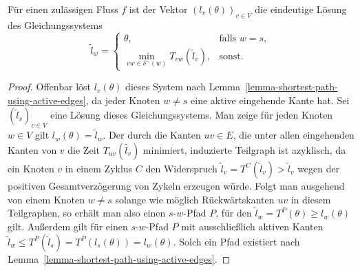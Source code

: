 \begin{proposition}\label{prop-arrival-times-vector}
	Für einen zulässigen Fluss $f$ ist der Vektor $(l_v(\theta))_{v\in V}$ die eindeutige Lösung des Gleichungssystems
	$$ \tilde{l}_w = \begin{cases}
	\theta, & \text{falls } w=s, \\
	\min\limits_{vw\in \delta^-(w)} T_{vw}(\tilde{l}_v), & \text{sonst}.
	\end{cases}$$
\end{proposition}
\begin{proof}
	Offenbar löst $l_v(\theta)$ dieses System nach Lemma~\ref{lemma-shortest-path-using-active-edges}, da jeder Knoten $w\neq s$ eine aktive eingehende Kante hat.
	Sei $(\tilde{l}_v)_{v\in V}$ eine Lösung dieses Gleichungssystems.
	Man zeige für jeden Knoten $w\in V$ gilt $l_w(\theta) = \tilde{l}_w$.
	Der durch die Kanten $uv\in E$, die unter allen eingehenden Kanten von $v$ die Zeit $T_{uv}(\tilde{l_v})$ minimiert, induzierte Teilgraph ist azyklisch,
	da ein Knoten $v$ in einem Zyklus $C$ den Widerspruch $\tilde{l}_v = T^C(\tilde{l}_v) > \tilde{l}_v$ wegen der positiven Gesamtverzögerung von Zykeln erzeugen würde.
	Folgt man ausgehend von einem Knoten $w\neq s$ solange wie möglich Rückwärtskanten $uv$ in diesem Teilgraphen, so erhält man also einen $s$-$w$-Pfad $P$, für den $\tilde{l}_w = T^P(\theta) \geq l_w(\theta)$ gilt.
	Außerdem gilt für einen $s$-$w$-Pfad $P$ mit ausschließlich aktiven Kanten $\tilde{l}_w \leq T^P(\tilde{l}_s) = T^P(l_s(\theta)) = l_w(\theta)$.
	Solch ein Pfad existiert nach Lemma~\ref{lemma-shortest-path-using-active-edges}.
\end{proof}

